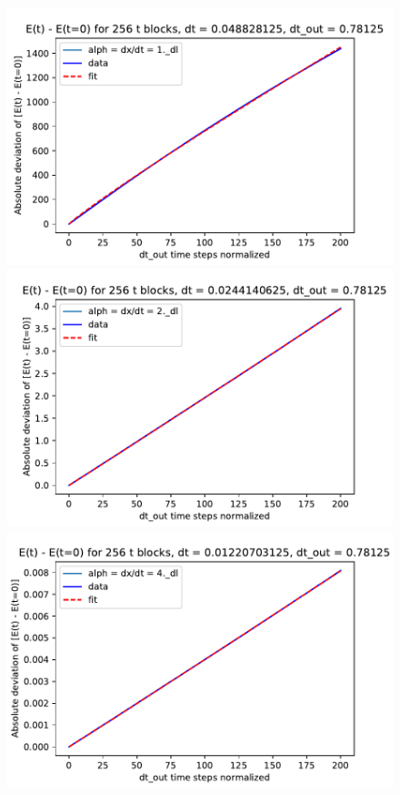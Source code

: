 \documentclass{article}
\begin{document}
\begin{figure}[H]
    \centering
    \includegraphics[scale=0.35]{E_dev_alph=1}
    \includegraphics[scale=0.35]{E_dev_alph=2}
    \includegraphics[scale=0.35]{E_dev_alph=4}

\end{figure}
\end{document}
